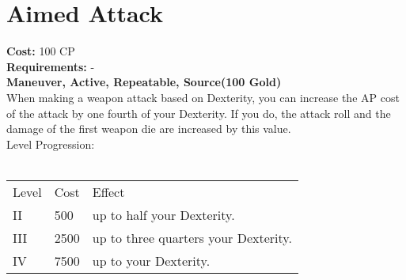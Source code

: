 \section{Aimed Attack}
\textbf{Cost:} 100 CP\\
\textbf{Requirements:} -\\
\textbf{Maneuver, Active, Repeatable, Source(100 Gold)}\\
When making a weapon attack based on Dexterity, you can increase the AP cost of the attack by one fourth of your Dexterity. If you do, the attack roll and the damage of the first weapon die are increased by this value.
\\
Level Progression:\\
\\
\begin{tabular}{l | l | l}
	Level & Cost & Effect\\
	II & 500 & up to half your Dexterity.\\
	III & 2500 & up to three quarters your Dexterity.\\
	IV & 7500 & up to your Dexterity.\\
\end{tabular}